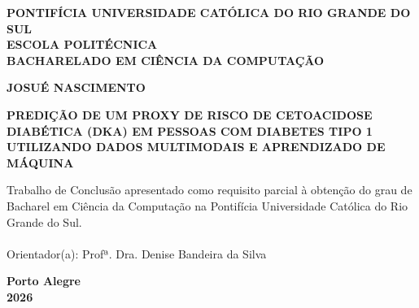 \documentclass[12pt,a4paper]{article}
\begin{document}
\begin{titlepage}
    \begin{center}
        \singlespacing
        \textbf{PONTIFÍCIA UNIVERSIDADE CATÓLICA DO RIO GRANDE DO SUL}\\
        \textbf{ESCOLA POLITÉCNICA}\\
        \textbf{BACHARELADO EM CIÊNCIA DA COMPUTAÇÃO}

        \vspace{4cm}

        \textbf{JOSUÉ NASCIMENTO}

        \vspace{4cm}

        \textbf{PREDIÇÃO DE UM PROXY DE RISCO DE CETOACIDOSE DIABÉTICA (DKA) EM PESSOAS COM DIABETES TIPO 1 UTILIZANDO DADOS MULTIMODAIS E APRENDIZADO DE MÁQUINA}

        \vspace{3cm}

        \begin{flushright}
            \begin{minipage}{8cm}
                \singlespacing
                Trabalho de Conclusão apresentado como requisito parcial à obtenção do grau de Bacharel em Ciência da Computação na Pontifícia Universidade Católica do Rio Grande do Sul.
                \\
                \\
                Orientador(a): Profª. Dra. Denise Bandeira da Silva
            \end{minipage}
        \end{flushright}

        \vfill

        \textbf{Porto Alegre}\\
        \textbf{2026}
    \end{center}
\end{titlepage}

\newpage
\end{document}
